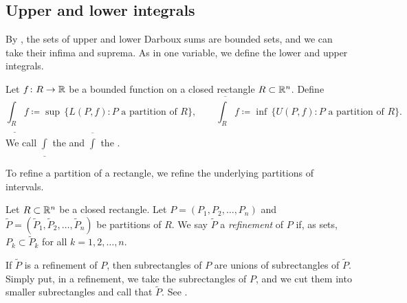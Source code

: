 \subsection{Upper and lower integrals}

By , the sets of upper and lower Darboux sums
are bounded sets, and we can take
their infima and suprema.  As in one variable, we define the lower and upper
integrals.

\begin{defn}
Let $f \colon R \to {\mathbb{R}}$ be a bounded function on a closed rectangle $R \subset
{\mathbb{R}}^n$.
Define
\begin{equation*}
\underline{\int_R} f
\coloneqq \sup \, \bigl\{ L(P,f) : P \text{ a partition of } R \bigr\} , 
\qquad
\overline{\int_R} f
\coloneqq \inf \, \bigl\{ U(P,f) : P \text{ a partition of } R \bigr\} .
\end{equation*}
We call $\underline{\int}$ the
\emph{} and
$\overline{\int}$ the \emph{}.
\end{defn}

To refine a partition of a rectangle, we refine
the underlying partitions of intervals.

\begin{defn}
Let $R \subset {\mathbb{R}}^n$ be a closed rectangle.
Let $P = ( P_1, P_2, \ldots, P_n )$
and $\widetilde{P} = ( \widetilde{P}_1, \widetilde{P}_2, \ldots, \widetilde{P}_n )$
be partitions of $R$.  We say $\widetilde{P}$ a
\emph{refinement} of $P$
if, as sets, $P_k \subset \widetilde{P}_k$ for all $k = 1,2,\ldots,n$.
\end{defn}

If $\widetilde{P}$ is a refinement of $P$,
then subrectangles of $P$ are unions of subrectangles of $\widetilde{P}$.
Simply put, in a refinement, we take the subrectangles of $P$,
and we cut them into smaller subrectangles and call that $\widetilde{P}$.
See .

\begin{myfigureht}
\caption{Example refinement of the partition from .
New  are marked in
dashed lines.  The exact order of the new subrectangles does not
matter.\label{mv:figrectpart}}
\end{myfigureht}

